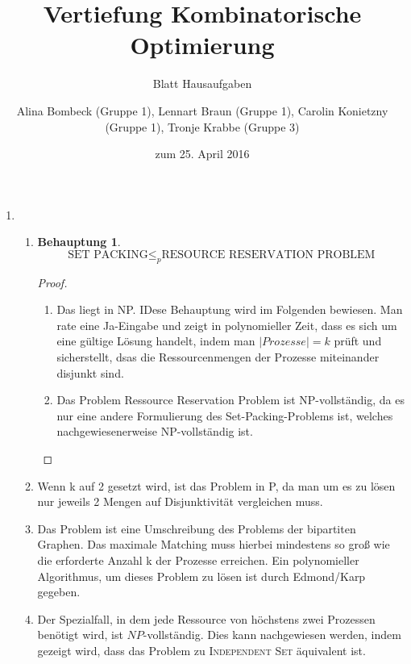 \documentclass[a4paper]{scrartcl}
\title{Vertiefung Kombinatorische Optimierung}
\subtitle{Blatt {\blattnr} Hausaufgaben}
\author{%
    Alina Bombeck (Gruppe 1),
    Lennart Braun (Gruppe 1),
    Carolin Konietzny (Gruppe 1),
    Tronje Krabbe (Gruppe 3)
}
\date{zum 25. April 2016}
\newtheorem*{proposition}{Behauptung}
\begin{document}
\maketitle


\begin{enumerate}[label=\bfseries \arabic*.]
\item %
\begin{enumerate}
    \item %
    \begin{proposition}
        \[ \text{SET PACKING} \leq_{p} \text{RESOURCE RESERVATION PROBLEM} \]
    \end{proposition}
    \begin{proof}
        \hfill \\
        \begin{enumerate}
            \item Das  liegt in NP. IDese Behauptung wird im Folgenden bewiesen.  
            Man rate eine Ja-Eingabe und zeigt in polynomieller Zeit, dass es sich um eine gültige Lösung handelt, indem man $|Prozesse| = k$ prüft und sicherstellt, dsas die Ressourcenmengen der Prozesse miteinander disjunkt sind.
            \item Das Problem Ressource Reservation Problem ist NP-vollständig, da es nur eine andere Formulierung des Set-Packing-Problems ist, welches nachgewiesenerweise NP-vollständig ist.
        \end{enumerate}
    \end{proof}

    \item %
       Wenn k auf 2 gesetzt wird, ist das Problem in P, da man um es zu lösen nur jeweils 2 Mengen auf Disjunktivität vergleichen muss.


    \item %
     Das Problem ist eine Umschreibung des Problems der bipartiten Graphen. Das maximale Matching muss hierbei mindestens so groß wie die erforderte Anzahl k der Prozesse erreichen. Ein polynomieller Algorithmus, um dieses Problem zu lösen ist durch Edmond/Karp gegeben.

    \item %
        Der Spezialfall, in dem jede Ressource von höchstens zwei Prozessen
        benötigt wird, ist $NP$-vollständig.
        Dies kann nachgewiesen werden, indem gezeigt wird, dass das Problem zu
        \textsc{Independent Set} äquivalent ist.


\end{enumerate}
\end{enumerate}
\end{document}
